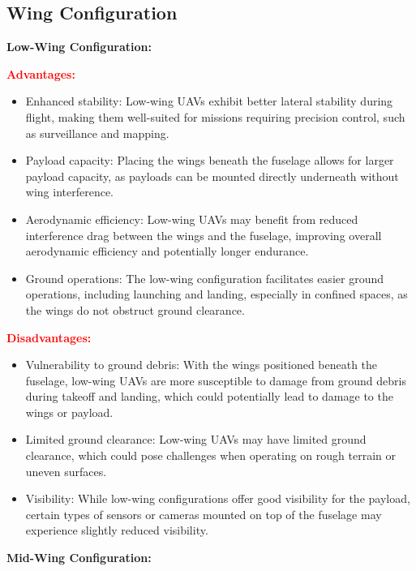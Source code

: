 \documentclass[12 pt]{article}
\begin{document}
\color{red}
\subsection{Wing Configuration}




{\color{red}\textbf{Low-Wing Configuration:}}

{\color{black}
\textbf{\textcolor{red}{Advantages:}}
\begin{itemize}
  \item Enhanced stability: Low-wing UAVs exhibit better lateral stability during flight, making them well-suited for missions requiring precision control, such as surveillance and mapping.
  \item Payload capacity: Placing the wings beneath the fuselage allows for larger payload capacity, as payloads can be mounted directly underneath without wing interference.
  \item Aerodynamic efficiency: Low-wing UAVs may benefit from reduced interference drag between the wings and the fuselage, improving overall aerodynamic efficiency and potentially longer endurance.
  \item Ground operations: The low-wing configuration facilitates easier ground operations, including launching and landing, especially in confined spaces, as the wings do not obstruct ground clearance.
\end{itemize}

\textbf{\textcolor{red}{Disadvantages:}}
\begin{itemize}
  \item Vulnerability to ground debris: With the wings positioned beneath the fuselage, low-wing UAVs are more susceptible to damage from ground debris during takeoff and landing, which could potentially lead to damage to the wings or payload.
  \item Limited ground clearance: Low-wing UAVs may have limited ground clearance, which could pose challenges when operating on rough terrain or uneven surfaces.
  \item Visibility: While low-wing configurations offer good visibility for the payload, certain types of sensors or cameras mounted on top of the fuselage may experience slightly reduced visibility.
\end{itemize}
}

{\color{red}\textbf{Mid-Wing Configuration:}}
\end{document}
